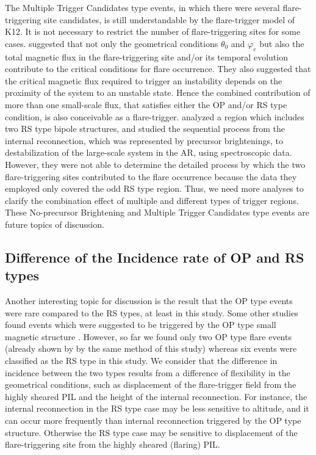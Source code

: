 \documentclass[10pt,preprint2]{aastex}
\begin{document}
The Multiple Trigger Candidates type events, in which there were several flare-triggering site candidates, is still understandable by the flare-trigger model of K12.
It is not necessary to restrict the number of flare-triggering sites for some cases.
\citet{bamba13, bamba14} suggested that not only the geometrical conditions $\theta_{0}$ and $\varphi_{e}$ but also the total magnetic flux in the flare-triggering site and/or its temporal evolution contribute to the critical conditions for flare occurrence.
They also suggested that the critical magnetic flux required to trigger an instability depends on the proximity of the system to an unstable state.
Hence the combined contribution of more than one small-scale flux, that satisfies either the OP and/or RS type condition, is also conceivable as a flare-trigger.
\citet{bamba17b} analyzed a region which includes two RS type bipole structures, and studied the sequential process from the internal reconnection, which was represented by precursor brightenings, to destabilization of the large-scale system in the AR, using spectroscopic data.
However, they were not able to determine the detailed process by which the two flare-triggering sites contributed to the flare occurrence because the data they employed only covered the odd RS type region.
Thus, we need more analyses to clarify the combination effect of multiple and different types of trigger regions.
These No-precursor Brightening and Multiple Trigger Candidates type events are future topics of discussion.

\subsection{Difference of the Incidence rate of OP and RS types} \label{sec:incidence}

Another interesting topic for discussion is the result that the OP type events were rare compared to the RS types, at least in this study.
Some other studies found events which were suggested to be triggered by the OP type small magnetic structure \citep{Palacios15, Wang17, Woods17}.
However, so far we found only two OP type flare events (already shown by \citet{bamba13} by the same method of this study) whereas six events were classified as the RS type in this study.
We consider that the difference in incidence between the two types results from a difference of flexibility in the geometrical conditions, such as displacement of the flare-trigger field from the highly sheared PIL and the height of the internal reconnection.
For instance, the internal reconnection in the RS type case may be less sensitive to altitude, and it can occur more frequently than internal reconnection triggered by the OP type structure.
Otherwise the RS type case may be sensitive to displacement of the flare-triggering site from the highly sheared (flaring) PIL.
\end{document}
